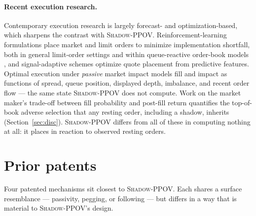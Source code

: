 \documentclass[11pt]{article}
\newcommand{\pov}{\textsc{Shadow-PPOV}}
\begin{document}
\paragraph{Recent execution research.} Contemporary execution research is
largely forecast- and optimization-based, which sharpens the contrast with
\pov{}. Reinforcement-learning formulations place market and limit orders to
minimize implementation shortfall, both in general limit-order settings
\cite{rlexec2025} and within queue-reactive order-book models
\cite{queuereactive2025}, and signal-adaptive schemes optimize quote placement
from predictive features. Optimal execution under \emph{passive} market impact
\cite{passiveimpact2026} models fill and impact as functions of spread, queue
position, displayed depth, imbalance, and recent order flow --- the same
state \pov{} does not compute. Work on the market maker's trade-off between
fill probability and post-fill return \cite{mmdilemma2025} quantifies the
top-of-book adverse selection that any resting order, including a shadow, inherits
(Section~\ref{sec:disc}). \pov{} differs from all of these in
computing nothing at all: it places in reaction to observed resting orders.

\section{Prior patents}
\label{sec:patents}

Four patented mechanisms sit closest to \pov{}. Each shares a surface
resemblance --- passivity, pegging, or following --- but differs in a way that
is material to \pov{}'s design.
\end{document}
